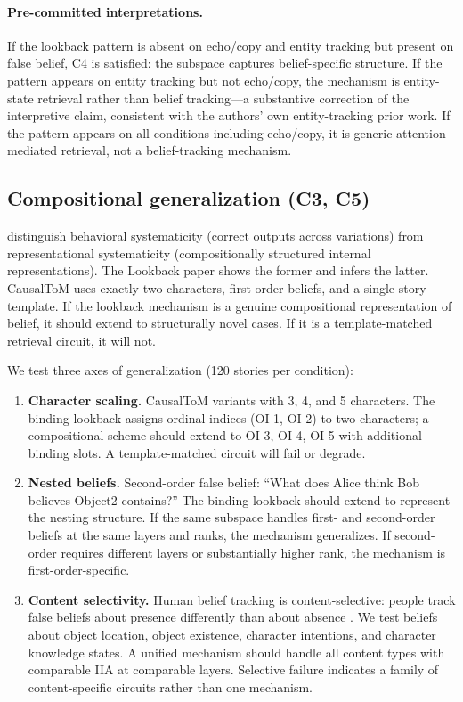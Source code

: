 \documentclass[11pt]{article}
\begin{document}
\paragraph{Pre-committed interpretations.} If the lookback pattern is absent on echo/copy and entity tracking but present on false belief, C4 is satisfied: the subspace captures belief-specific structure. If the pattern appears on entity tracking but not echo/copy, the mechanism is entity-state retrieval rather than belief tracking---a substantive correction of the interpretive claim, consistent with the authors' own entity-tracking prior work. If the pattern appears on all conditions including echo/copy, it is generic attention-mediated retrieval, not a belief-tracking mechanism.

\subsection{Compositional generalization (C3, C5)}
\label{sec:composition}

\citet{vegner2025systematicity} distinguish behavioral systematicity (correct outputs across variations) from representational systematicity (compositionally structured internal representations). The Lookback paper shows the former and infers the latter. CausalToM uses exactly two characters, first-order beliefs, and a single story template. If the lookback mechanism is a genuine compositional representation of belief, it should extend to structurally novel cases. If it is a template-matched retrieval circuit, it will not.

We test three axes of generalization (120 stories per condition):

\begin{enumerate}
\item \textbf{Character scaling.} CausalToM variants with 3, 4, and 5 characters. The binding lookback assigns ordinal indices (OI-1, OI-2) to two characters; a compositional scheme should extend to OI-3, OI-4, OI-5 with additional binding slots. A template-matched circuit will fail or degrade.
\item \textbf{Nested beliefs.} Second-order false belief: ``What does Alice think Bob believes Object2 contains?'' The binding lookback should extend to represent the nesting structure. If the same subspace handles first- and second-order beliefs at the same layers and ranks, the mechanism generalizes. If second-order requires different layers or substantially higher rank, the mechanism is first-order-specific.
\item \textbf{Content selectivity.} Human belief tracking is content-selective: people track false beliefs about presence differently than about absence \citep{schuwerk2015implicit}. We test beliefs about object location, object existence, character intentions, and character knowledge states. A unified mechanism should handle all content types with comparable IIA at comparable layers. Selective failure indicates a family of content-specific circuits rather than one mechanism.
\end{enumerate}
\end{document}
